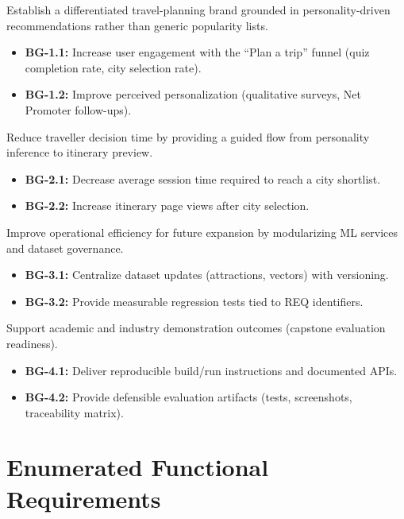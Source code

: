 \documentclass[12pt,oneside,openany]{report}
\begin{document}
\begin{description}[leftmargin=1.2cm,style=nextline,align=left]
\item[\textbf{BG-1:}] Establish a differentiated travel-planning brand grounded in personality-driven recommendations rather than generic popularity lists.
\begin{itemize}[nosep]
  \item \textbf{BG-1.1:} Increase user engagement with the ``Plan a trip'' funnel (quiz completion rate, city selection rate).
  \item \textbf{BG-1.2:} Improve perceived personalization (qualitative surveys, Net Promoter follow-ups).
\end{itemize}
\item[\textbf{BG-2:}] Reduce traveller decision time by providing a guided flow from personality inference to itinerary preview.
\begin{itemize}[nosep]
  \item \textbf{BG-2.1:} Decrease average session time required to reach a city shortlist.
  \item \textbf{BG-2.2:} Increase itinerary page views after city selection.
\end{itemize}
\item[\textbf{BG-3:}] Improve operational efficiency for future expansion by modularizing ML services and dataset governance.
\begin{itemize}[nosep]
  \item \textbf{BG-3.1:} Centralize dataset updates (attractions, vectors) with versioning.
  \item \textbf{BG-3.2:} Provide measurable regression tests tied to REQ identifiers.
\end{itemize}
\item[\textbf{BG-4:}] Support academic and industry demonstration outcomes (capstone evaluation readiness).
\begin{itemize}[nosep]
  \item \textbf{BG-4.1:} Deliver reproducible build/run instructions and documented APIs.
  \item \textbf{BG-4.2:} Provide defensible evaluation artifacts (tests, screenshots, traceability matrix).
\end{itemize}
\end{description}

\section{Enumerated Functional Requirements}
\end{document}
